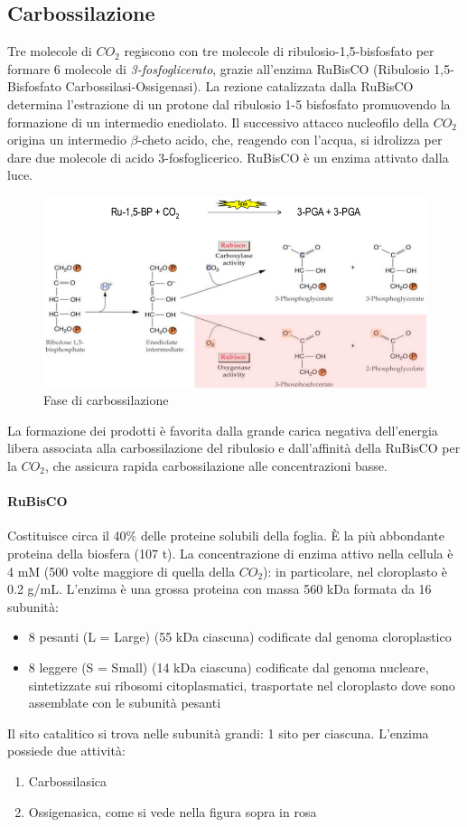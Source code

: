 \documentclass[a4paper,12pt]{book}
\begin{document}
\subsection{Carbossilazione}
Tre molecole di $CO_{2}$ regiscono con tre molecole di ribulosio-1,5-bisfosfato per formare 6 molecole di \emph{3-fosfoglicerato}, grazie all'enzima RuBisCO (Ribulosio 1,5-Bisfosfato Carbossilasi-Ossigenasi). La rezione catalizzata dalla RuBisCO determina l’estrazione di un
protone dal ribulosio 1-5 bisfosfato promuovendo la formazione di un intermedio enediolato. Il successivo attacco
nucleofilo della $CO_{2}$ origina un intermedio $\beta$-cheto acido, che, reagendo con l’acqua, si idrolizza per dare due molecole
di acido 3-fosfoglicerico. RuBisCO è un enzima attivato dalla luce. 
\begin{figure}[H]
\centering
\includegraphics[scale=0.4]{immagini/carbossilazione.jpg}
\caption{Fase di carbossilazione}
\end{figure}
La formazione dei prodotti è favorita dalla grande carica negativa dell'energia libera associata alla carbossilazione del ribulosio e dall'affinità della RuBisCO per la $CO_{2}$, che assicura rapida carbossilazione alle concentrazioni basse.

\paragraph{RuBisCO}
Costituisce circa il 40\% delle proteine solubili della foglia. È la più abbondante proteina della biosfera
(107 t). La concentrazione di enzima attivo nella cellula è 4 mM (500 volte maggiore di quella della $CO_{2}$): in particolare, nel cloroplasto è 0.2 g/mL.
L’enzima è una grossa proteina con massa 560 kDa formata da 16 subunità:
\begin{itemize}
\item{8 pesanti (L = Large) (55 kDa ciascuna) codificate dal genoma cloroplastico}
\item{8 leggere (S = Small) (14 kDa ciascuna) codificate dal genoma nucleare, sintetizzate sui ribosomi
citoplasmatici, trasportate nel cloroplasto dove sono assemblate con le subunità pesanti}
\end{itemize}
Il sito catalitico si trova nelle subunità grandi: 1 sito per ciascuna.
L’enzima possiede due attività:
\begin{enumerate}
\item{Carbossilasica}
\item{Ossigenasica, come si vede nella figura sopra in rosa}
\end{enumerate}
\end{document}

